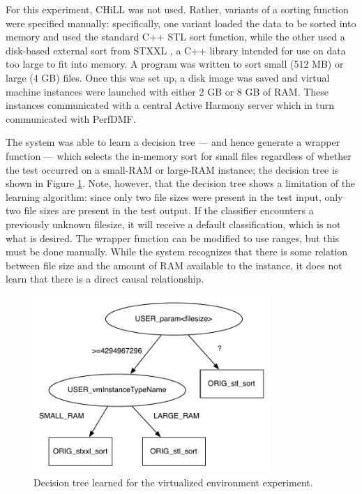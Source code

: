 \documentclass[msthesis,justified,copyright,final,numbers,sort&compress,
gsmodern,amstex,natbib]{uothesis}
\begin{document}
For this experiment, CHiLL was not used. Rather, variants of a sorting function were specified manually: specifically, one variant loaded the data to be sorted into memory and used the standard C++ STL sort function, while the other used a disk-based external sort from STXXL \cite{stxxl}, a C++ library intended for use on data too large to fit into memory. A program was written to sort small (512 MB) or large (4 GB) files. Once this was set up, a disk image was saved and virtual machine instances were launched with either 2 GB or 8 GB of RAM. These instances communicated with a central Active Harmony server which in turn communicated with PerfDMF. 

The system was able to learn a decision tree --- and hence generate a wrapper function --- which selects the in-memory sort for small files regardless of whether the test occurred on a small-RAM or large-RAM instance; the decision tree is shown in Figure \ref{fig:vm_exp}. Note, however, that the decision tree shows a limitation of the learning algorithm: since only two file sizes were present in the test input, only two file sizes are present in the test output. If the classifier encounters a previously unknown filesize, it will receive a default classification, which is not what is desired. The wrapper function can be modified to use ranges, but this must be done manually. While the system recognizes that there is some relation between file size and the amount of RAM available to the instance, it does not learn that there is a direct causal relationship.

\begin{figure}[btp]
\centering
\includegraphics[width=0.8\textwidth]{vm_exp.pdf}
\caption{Decision tree learned for the virtualized environment experiment.}
\label{fig:vm_exp}
\end{figure}
\end{document}
